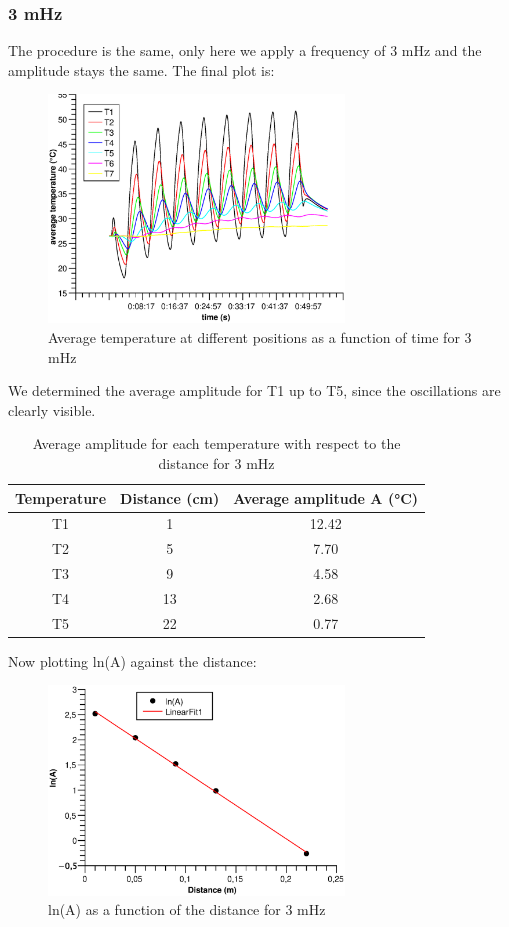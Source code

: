 \documentclass{scrartcl}
\begin{document}
\subsubsection{3 mHz}

The procedure is the same, only here we apply a frequency of 3 mHz and the amplitude stays the same.
The final plot is:

\begin{figure}[H]
    \centering
    \includegraphics[width=0.7\textwidth]{3mHz.eps}
    \caption{Average temperature at different positions as a function of time for 3 mHz}
    \label{fig:3mHz}
\end{figure}

We determined the average amplitude for T1 up to T5, since the oscillations are clearly visible.
\begin{table}[H]
    \centering
    \begin{tabular}{c|c|c}
        Temperature & Distance (cm) & Average amplitude A (°C) \\
        \hline
        T1 & 1 & 12.42 \\
        T2 & 5 & 7.70 \\
        T3 & 9 & 4.58 \\
        T4 & 13 & 2.68 \\
        T5 & 22 & 0.77
    \end{tabular}
    \caption{Average amplitude for each temperature with respect to the distance for 3 mHz}
    \label{tab:30Hz_A}
\end{table}

Now plotting ln(A) against the distance:
\begin{figure}[H]
    \centering
    \includegraphics[width=0.7\textwidth]{ln_3mHz.eps}
    \caption{ln(A) as a function of the distance for 3 mHz}
    \label{fig:ln_3}
\end{figure}
\end{document}
